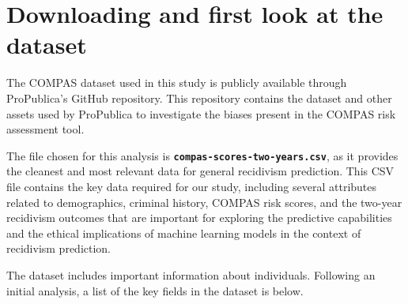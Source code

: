 

\section{Downloading and first look at the dataset}

The COMPAS dataset used in this study is publicly available through ProPublica's GitHub repository. This repository contains the dataset and other assets used by ProPublica to investigate the biases present in the COMPAS risk assessment tool.

The file chosen for this analysis is \textbf{\texttt{compas-scores-two-years.csv}}, as it provides the cleanest and most relevant data for general recidivism prediction. This CSV file contains the key data required for our study, including several attributes related to demographics, criminal history, COMPAS risk scores, and the two-year recidivism outcomes that are important for exploring the predictive capabilities and the ethical implications of machine learning models in the context of recidivism prediction. 

The dataset includes important information about individuals. Following an initial analysis, a list of the key fields in the dataset is below.

